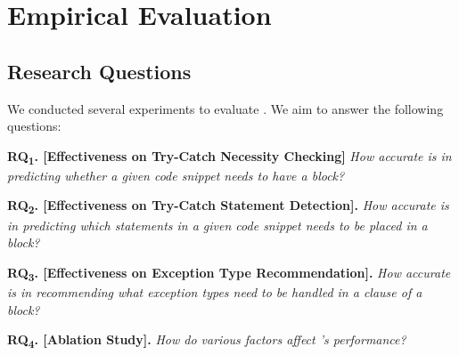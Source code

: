 \section{Empirical Evaluation}
\label{sec:eval}

\subsection{Research Questions}

We conducted several experiments to evaluate {\tool}. We aim to
answer the following questions:

\vspace{2pt}

\noindent \textbf{RQ\textsubscript{1}. [Effectiveness on Try-Catch Necessity Checking]}
  {\em How accurate is {\tool} in predicting whether a given code snippet
needs to have a  block?}
    


\vspace{2pt}
\noindent \textbf{RQ\textsubscript{2}. [Effectiveness on Try-Catch Statement Detection].} {\em How accurate is {\tool} in predicting which statements in a given code snippet needs to be placed in a  block?}


\vspace{2pt}
\noindent \textbf{RQ\textsubscript{3}. [Effectiveness on Exception Type Recommendation].}
{\em How accurate is {\tool} in recommending what exception types need to be handled in a  clause of a  block?}

\vspace{2pt}
\noindent \textbf{RQ\textsubscript{4}. [Ablation Study].}
{\em How do various factors affect {\tool}'s performance?}


